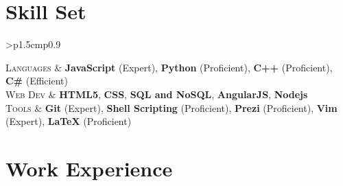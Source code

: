 \documentclass[a4paper,10pt]{article} %
\newcommand{\itemlist}[1]{
    \begin{tabular}{>{\raggedleft}p{1.5cm}p{0.9\linewidth}}
        #1
    \end{tabular}
}
\begin{document}
\section{Skill Set}

\itemlist {
    \textsc{Languages} %
            & \textbf{JavaScript} (Expert), \textbf{Python} (Proficient), \textbf{C++}
              (Proficient), \textbf{C\#} (Efficient)\\
    \textsc{Web Dev} %
            & \textbf{HTML5}, \textbf{CSS}, \textbf{SQL and NoSQL}, \textbf{AngularJS}, \textbf{Nodejs}\\
    \textsc{Tools} %
            & \textbf{Git} (Expert), \textbf{Shell Scripting} (Proficient),
              \textbf{Prezi} (Proficient), \textbf{Vim} (Expert), \textbf{LaTeX}
              (Proficient)\\
}


\section{Work Experience}
\end{document}
